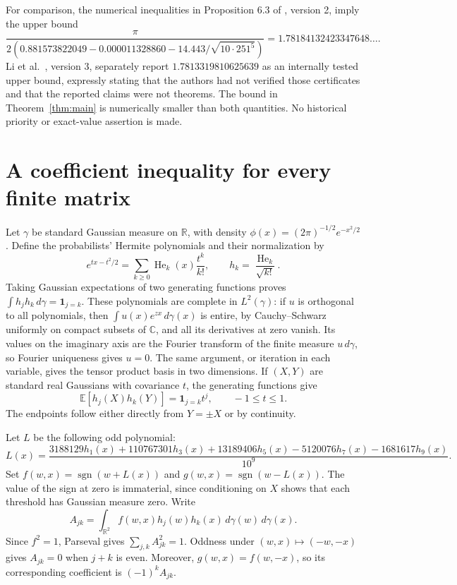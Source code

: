 \documentclass[11pt]{article}
\theoremstyle{definition}\newtheorem{definition}[theorem]{Definition}
\newcommand{\R}{\mathbb R}
\newcommand{\C}{\mathbb C}
\newcommand{\E}{\mathbb E}
\newcommand{\He}{\operatorname{He}}
\newcommand{\sgn}{\operatorname{sgn}}
\newcommand{\dd}{\,d}
\begin{document}
For comparison, the numerical inequalities in Proposition 6.3 of
\cite{saha}, version 2, imply the upper bound
\begin{equation}\label{eq:comparison-saha}
 \frac{\pi}{2\left(0.881573822049-0.000011328860
              -14.443/\sqrt{10\cdot251^5}\right)}
 =1.78184132423347648\ldots.
\end{equation}
Li et al.~\cite{li}, version 3, separately report $1.7813319810625639$
as an internally tested upper bound, expressly stating that the authors had
not verified those certificates and that the reported claims were not
theorems. The bound in Theorem~\ref{thm:main} is numerically smaller than
both quantities. No historical priority or exact-value assertion is made.

\section{A coefficient inequality for every finite matrix}
Let $\gamma$ be standard Gaussian measure on $\R$, with density
$\phi(x)=(2\pi)^{-1/2}e^{-x^2/2}$. Define the probabilists' Hermite
polynomials and their normalization by
\[
 e^{tx-t^2/2}=\sum_{k\geq0}\He_k(x)\frac{t^k}{k!},
 \qquad h_k=\frac{\He_k}{\sqrt{k!}}.
\]
Taking Gaussian expectations of two generating functions proves
$\int h_jh_k\dd\gamma=\mathbf1_{j=k}$. These polynomials are complete
in $L^2(\gamma)$: if $u$ is orthogonal to all polynomials, then
$\int u(x)e^{zx}\dd\gamma(x)$ is entire, by Cauchy--Schwarz uniformly on
compact subsets of $\C$, and all its derivatives at zero vanish.
Its values on the imaginary axis are the Fourier transform of the finite
measure $u\dd\gamma$, so Fourier uniqueness gives $u=0$. The same argument,
or iteration in each variable, gives the tensor product basis in two
dimensions. If $(X,Y)$ are standard real Gaussians with covariance $t$, the
generating functions give
\begin{equation}\label{eq:hermite-correlation}
 \E[h_j(X)h_k(Y)]=\mathbf1_{j=k}t^j,\qquad -1\leq t\leq1.
\end{equation}
The endpoints follow either directly from $Y=\pm X$ or by continuity.

Let $L$ be the following odd polynomial:
\begin{equation}\label{eq:L}
 L(x)=\frac{3188129h_1(x)+110767301h_3(x)+13189406h_5(x)
                   -5120076h_7(x)-1681617h_9(x)}{10^9}.
\end{equation}
Set $f(w,x)=\sgn(w+L(x))$ and $g(w,x)=\sgn(w-L(x))$.
The value of the sign at zero is immaterial, since conditioning on $X$
shows that each threshold has Gaussian measure zero. Write
\[
 A_{jk}=\int_{\R^2}f(w,x)h_j(w)h_k(x)\dd\gamma(w)\dd\gamma(x).
\]
Since $f^2=1$, Parseval gives $\sum_{j,k}A_{jk}^2=1$. Oddness under
$(w,x)\mapsto(-w,-x)$ gives $A_{jk}=0$ when $j+k$ is even.
Moreover, $g(w,x)=f(w,-x)$, so its corresponding coefficient is
$(-1)^k A_{jk}$.
\end{document}
